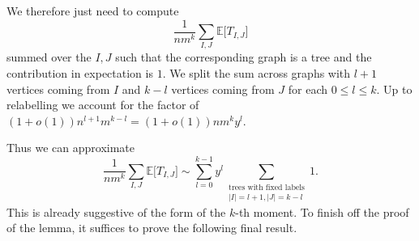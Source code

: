 We therefore just need to compute \[
    \frac{1}{nm^k}\sum_{I,J}\mathbb{E}\Big[T_{I,J}\Big]
\]
summed over the $I,J$ such that the corresponding graph is a tree and the contribution in expectation is $1$. We split the sum across graphs with $l+1$ vertices coming from $I$ and $k-l$ vertices coming from $J$ for each $0 \leq l\leq k$.
Up to relabelling we account for the factor of $(1+o(1))n^{l+1}m^{k-l}=(1+o(1))nm^ky^l$.

Thus we can approximate \[
    \frac{1}{nm^k}\sum_{I,J}\mathbb{E}\Big[T_{I,J}\Big]\sim \sum_{l=0}^{k-1} y^l\sum_{\substack{\textrm{trees with fixed labels}\\
    |I|={l+1},|J|=k-l}}1.
\]
This is already suggestive of the form of the $k$-th moment. To finish off the proof of the lemma, it suffices to prove the following final result.
